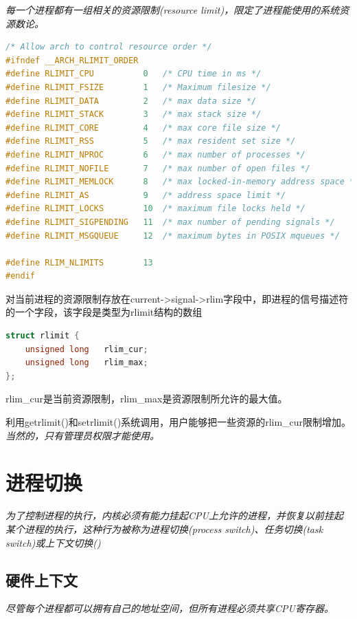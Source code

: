     \emph{每一个进程都有一组相关的资源限制(resource limit)，限定了进程能使用的系统资源数论。}

\begin{lstlisting}[language=C++]
/* Allow arch to control resource order */
#ifndef __ARCH_RLIMIT_ORDER
#define RLIMIT_CPU		    0	/* CPU time in ms */
#define RLIMIT_FSIZE		1	/* Maximum filesize */
#define RLIMIT_DATA		    2	/* max data size */
#define RLIMIT_STACK		3	/* max stack size */
#define RLIMIT_CORE		    4	/* max core file size */
#define RLIMIT_RSS		    5	/* max resident set size */
#define RLIMIT_NPROC		6	/* max number of processes */
#define RLIMIT_NOFILE		7	/* max number of open files */
#define RLIMIT_MEMLOCK		8	/* max locked-in-memory address space */
#define RLIMIT_AS		    9	/* address space limit */
#define RLIMIT_LOCKS		10	/* maximum file locks held */
#define RLIMIT_SIGPENDING	11	/* max number of pending signals */
#define RLIMIT_MSGQUEUE		12	/* maximum bytes in POSIX mqueues */

#define RLIM_NLIMITS		13
#endif
\end{lstlisting}

    对当前进程的资源限制存放在current->signal->rlim字段中，即进程的信号描述符的一个字段，该字段是类型为rlimit结构的数组

\begin{lstlisting}[language=C++]
struct rlimit {
    unsigned long	rlim_cur;
    unsigned long	rlim_max;
};
\end{lstlisting}

    rlim\_cur是当前资源限制，rlim\_max是资源限制所允许的最大值。

    利用getrlimit()和setrlimit()系统调用，用户能够把一些资源的rlim\_cur限制增加。\emph{当然的，只有管理员权限才能使用。}

\section{进程切换}

    \emph{为了控制进程的执行，内核必须有能力挂起CPU上允许的进程，并恢复以前挂起某个进程的执行，这种行为被称为进程切换(process switch)、任务切换(task switch)或上下文切换()}

\subsection{硬件上下文}

    \emph{尽管每个进程都可以拥有自己的地址空间，但所有进程必须共享CPU寄存器。}

